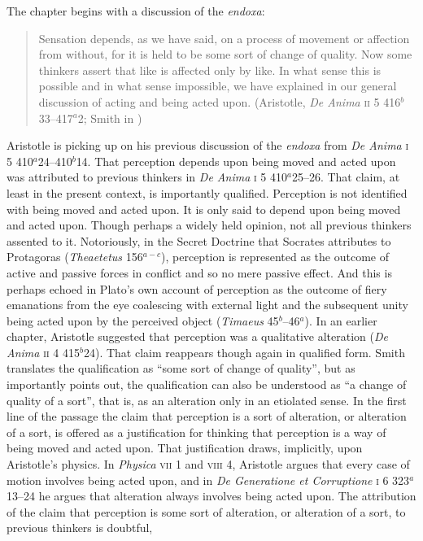 The chapter begins with a discussion of the \emph{endoxa}:
\begin{quote}
	Sensation depends, as we have said, on a process of movement or affection from without, for it is held to be some sort of change of quality. Now some thinkers assert that like is affected only by like. In what sense this is possible and in what sense impossible, we have explained in our general discussion of acting and being acted upon. (Aristotle, \emph{De Anima} \textsc{ii} 5 416\( ^{b} \)33--417\( ^{a} \)2; Smith in \citealt[29]{Barnes:1984uq})
\end{quote}
Aristotle is picking up on his previous discussion of the \emph{endoxa} from \emph{De Anima} \textsc{i} 5 410\( ^{a} \)24--410\( ^{b} \)14. That perception depends upon being moved and acted upon was attributed to previous thinkers in \emph{De Anima} \textsc{i} 5 410\( ^{a} \)25--26. That claim, at least in the present context, is importantly qualified. Perception is not identified with being moved and acted upon. It is only said to depend upon being moved and acted upon. Though perhaps a widely held opinion, not all previous thinkers assented to it. Notoriously, in the Secret Doctrine that Socrates attributes to Protagoras (\emph{Theaetetus} 156\( ^{a-c} \)), perception is represented as the outcome of active and passive forces in conflict and so no mere passive effect. And this is perhaps echoed in Plato's own account of perception as the outcome of fiery emanations from the eye coalescing with external light and the subsequent unity being acted upon by the perceived object  (\emph{Timaeus} 45\( ^{b} \)--46\( ^{a} \)). In an earlier chapter, Aristotle suggested that perception was a qualitative alteration (\emph{De Anima} \textsc{ii} 4 415\( ^{b} \)24). That claim reappears though again in qualified form. Smith translates the qualification as ``some sort of change of quality'', but as \citet[36--37]{Burnyeat:2002an} importantly points out, the qualification can also be understood as ``a change of quality of a sort'', that is, as an alteration only in an etiolated sense. In the first line of the passage the claim that perception is a sort of alteration, or alteration of a sort, is offered as a justification for thinking that perception is a way of being moved and acted upon. That justification draws, implicitly, upon Aristotle's physics. In \emph{Physica} \textsc{vii} 1 and \textsc{viii} 4, Aristotle argues that every case of motion involves being acted upon, and in \emph{De Generatione et Corruptione} \textsc{i} 6 323\( ^{a} \)13--24 he argues that alteration always involves being acted upon. The attribution of the claim that perception is some sort of alteration, or alteration of a sort, to previous thinkers is doubtful, 